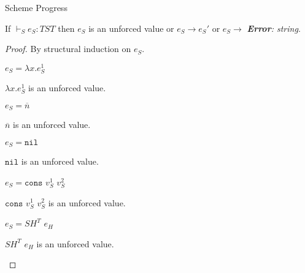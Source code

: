 \begin{theorem}{Scheme Progress}

\label{thmpss}

If $\vdash_{S}e_{S}:TST$ then $e_{S}$ is an unforced value or $e_{S}\rightarrow e_{S}'$ or $e_{S}\rightarrow$ \emph{\textbf{Error}: string}.

\begin{proof}

By structural induction on $e_{S}$.


\begin{case}

$e_{S}=\lambda x.e_{S}^{1}$

$\lambda x.e_{S}^{1}$ is an unforced value.

\end{case}


\begin{case}

$e_{S}=\overline{n}$

$\overline{n}$ is an unforced value.

\end{case}


\begin{case}

$e_{S}=\mathtt{nil}$

$\mathtt{nil}$ is an unforced value.

\end{case}


\begin{case}

$e_{S}=\mathtt{cons}$ $v_{S}^{1}$ $v_{S}^{2}$

$\mathtt{cons}$ $v_{S}^{1}$ $v_{S}^{2}$ is an unforced value.

\end{case}


\begin{case}

$e_{S}=SH^{T}$ $e_{H}$

$SH^{T}$ $e_{H}$ is an unforced value.

\end{case}


\begin{case}


\end{case}
\end{proof}
\end{theorem}
